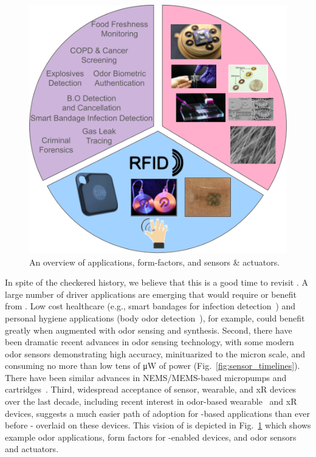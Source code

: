 \begin{figure}
    \centering
    \includegraphics[width=0.7\linewidth]{./figs/odor_vision.png}
    \caption{\small
        An overview of \olfc{} applications,
        form-factors, and sensors \& actuators.
    }
    \label{fig:vision}
\end{figure}

In spite of the checkered history, we believe that this is a good time to
revisit \olfc{}. A large number of driver applications are emerging that would
require or benefit from \olfc{}. Low cost healthcare (e.g., smart bandages for
infection detection~\cite{derakhshandeh2018smart})  and personal hygiene
applications (body odor detection~\cite{wongchoosuk2009detection, jha2015quick,
jha2016gc, jha2015human}), for example, could benefit greatly when augmented
with odor sensing and synthesis. Second, there have been dramatic recent
advances in odor sensing technology, with some modern odor sensors
demonstrating high accuracy, minituarized to the micron scale, and consuming no
more than low tens of \si{\micro\watt} of power
(Fig.~\ref{fig:sensor_timelines}).  There have been similar advances in
NEMS/MEMS-based micropumps and cartridges~\cite{tillotson2006scent}.  Third,
widespread acceptance of sensor, wearable, and xR devices over the last decade,
including recent interest in odor-based wearable~\cite{olorama_technology,
tillotson2006scent, amores2017essence, anthrotronix_2019, peters_2019,
amores2018promoting, bahremand2022smell} and xR~\cite{stewart_2022} devices,
suggests a much easier path of adoption for \olfc{}-based applications than
ever before - overlaid on these devices. This vision of \olfc{} is
depicted in Fig.~\ref{fig:vision} which shows example odor applications, form
factors for \olfc{}-enabled devices, and odor sensors and actuators.
